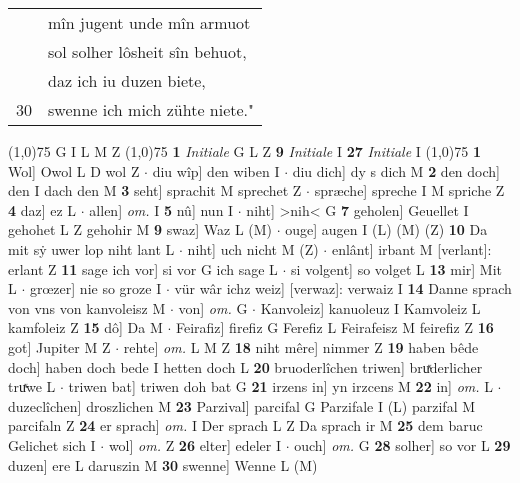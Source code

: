 \documentclass[8pt,a4paper,notitlepage]{article}
\begin{document}
\begin{table}[ht]
\begin{minipage}[t]{0.5\linewidth}
\begin{tabular}{rl}
 & mîn jugent unde mîn armuot\\ 
 & sol solher lôsheit sîn behuot,\\ 
 & daz ich iu duzen biete,\\ 
30 & swenne ich mich zühte niete."\\ 
\end{tabular}
\scriptsize
\line(1,0){75} \newline
G I L M Z \newline
\line(1,0){75} \newline
\textbf{1} \textit{Initiale} G L Z  \textbf{9} \textit{Initiale} I  \textbf{27} \textit{Initiale} I  \newline
\line(1,0){75} \newline
\textbf{1} Wol] Owol L D wol Z  $\cdot$ diu wîp] den wiben I  $\cdot$ diu dich] dy s dich M \textbf{2} den doch] den I dach den M \textbf{3} seht] sprachit M sprechet Z  $\cdot$ spræche] spreche I M spriche Z \textbf{4} daz] ez L  $\cdot$ allen] \textit{om.} I \textbf{5} nû] nun I  $\cdot$ niht] >nih< G \textbf{7} geholen] Geuellet I gehohet L Z gehohir M \textbf{9} swaz] Waz L (M)  $\cdot$ ouge] augen I (L) (M) (Z) \textbf{10} Da mit sẏ uwer lop niht lant L  $\cdot$ niht] uch nicht M (Z)  $\cdot$ enlânt] irbant M [verlant]: erlant Z \textbf{11} sage ich vor] si vor G ich sage L  $\cdot$ si volgent] so volget L \textbf{13} mir] Mit L  $\cdot$ grœzer] nie so groze I  $\cdot$ vür wâr ichz weiz] [verwaz]: verwaiz I \textbf{14} Danne sprach von vns von kanvoleisz M  $\cdot$ von] \textit{om.} G  $\cdot$ Kanvoleiz] kanuoleuz I Kamvoleiz L kamfoleiz Z \textbf{15} dô] Da M  $\cdot$ Feirafiz] firefiz G Ferefiz L Feirafeisz M feirefiz Z \textbf{16} got] Jupiter M Z  $\cdot$ rehte] \textit{om.} L M Z \textbf{18} niht mêre] nimmer Z \textbf{19} haben bêde doch] haben doch bede I hetten doch L \textbf{20} bruoderlîchen triwen] bruͯderlicher truͯwe L  $\cdot$ triwen bat] triwen doh bat G \textbf{21} irzens in] yn irzcens M \textbf{22} in] \textit{om.} L  $\cdot$ duzeclîchen] droszlichen M \textbf{23} Parzival] parcifal G Parzifale I (L) parzifal M parcifaln Z \textbf{24} er sprach] \textit{om.} I Der sprach L Z Da sprach ir M \textbf{25} dem baruc Gelichet sich I  $\cdot$ wol] \textit{om.} Z \textbf{26} elter] edeler I  $\cdot$ ouch] \textit{om.} G \textbf{28} solher] so vor L \textbf{29} duzen] ere L daruszin M \textbf{30} swenne] Wenne L (M) \newline
\end{minipage}
\hspace{0.5cm}
\begin{minipage}[t]{0.5\linewidth}

\end{minipage}
\end{table}
\end{document}
